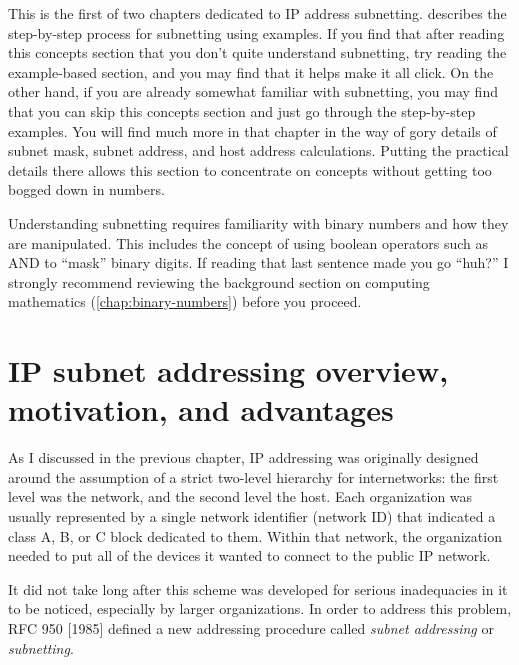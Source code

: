 \begin{note}
This is the first of two chapters dedicated to IP address subnetting.
 describes the step-by-step process for subnetting using examples.
If you find that after reading this concepts section that you don't quite understand subnetting,
try reading the example-based section, and you may find that it helps make it all click.
On the other hand, if you are already somewhat familiar with subnetting, you may find that you can skip this concepts section
and just go through the step-by-step examples.
You will find much more in that chapter in the way of gory details of subnet mask, subnet
address, and host address calculations.
Putting the practical details there allows this section to concentrate on concepts without getting too
bogged down in numbers.
\end{note}


\begin{backgroundinfo}
Understanding subnetting requires familiarity with binary numbers and how they are manipulated.
This includes the concept of using boolean operators such as AND to ``mask'' binary digits.
If reading that last sentence made you go ``huh?'' I strongly recommend reviewing the background section on
computing mathematics (\vref{chap:binary-numbers}) before you proceed.
\end{backgroundinfo}




\section{IP subnet addressing overview, motivation, and advantages}

As I discussed in the previous chapter, IP addressing was originally
designed around the assumption of a strict two-level hierarchy for internetworks: the first level was the network, and the second level the
host.
Each organization was usually represented by a single network identifier (network ID) that indicated a class A, B, or C block
dedicated to them.
Within that network, the organization needed to put all of the devices it wanted to connect to the public IP network.

It did not take long after this scheme was developed for serious
inadequacies in it to be noticed, especially by larger organizations. In
order to address this problem, RFC 950 {[}1985{]} defined a new
addressing procedure called {\emph{subnet addressing}} or
{\emph{subnetting}}.

